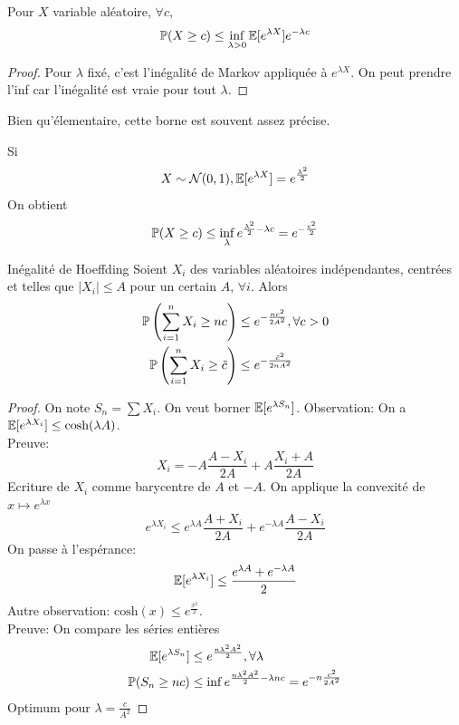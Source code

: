 \documentclass[]{report}
\begin{document}
    \begin{prop}{}{}
        Pour $X$ variable aléatoire, $\forall c,$
        \[\mathbb{P}(X\ge c)\le \inf_{\lambda >0}\mathbb{E}[e^{\lambda X}]e^{-\lambda c}\]
    \end{prop}

    \begin{proof}
        Pour $\lambda$ fixé, c'est l'inégalité de Markov appliquée à $e^{\lambda X}$. On peut prendre l'inf car l'inégalité est vraie pour tout $\lambda$.
    \end{proof}

    \begin{re}{}{}
        Bien qu'élementaire, cette borne est souvent assez précise.
    \end{re}

    \begin{ex}{}{}
        Si
        \[X\sim \mathcal{N}(0,1),\mathbb{E}[ e^{\lambda X}]=e^{\frac{\lambda^2}{2}}\]
        On obtient
        \[\mathbb{P}(X\ge c)\le \inf_\lambda e^{\frac{\lambda^2}{2}-\lambda c}=e^{-\frac{c^2}{2}}\]
    \end{ex}

    \begin{tm}{Inégalité de Hoeffding}{}
        Soient $X_i$ des variables aléatoires indépendantes, centrées et telles que $|X_i|\le A$ pour un certain $A$, $\forall i$. Alors
        \begin{align*}
            \mathbb{P}\left(\sum_{i=1}^{n}X_i\ge nc\right)&\le e^{-\frac{nc^2}{2A^2}},\forall c>0\\
            \mathbb{P}\left(\sum_{i=1}^{n}X_i\ge \tilde{c}\right)&\le e^{-\frac{\tilde{c}^2}{2 nA^2}}
        \end{align*}
    \end{tm}

    \begin{proof}
        On note $S_n=\sum X_i$. On veut borner $\mathbb{E}[e^{\lambda S_n}]$. Observation: On a $\mathbb{E}[e^{\lambda X_i}]\le \text{cosh}(\lambda A)$.\\
        Preuve: \[X_i = -A\frac{A-X_i}{2A}+ A\frac{X_i+A}{2A}\]
        Ecriture de $X_i$ comme barycentre de $A$ et $-A$. On applique la convexité de $x\mapsto e^{\lambda x}$
        \[e^{\lambda X_i}\le e^{\lambda A}\frac{A+X_i}{2A}+e^{-\lambda A}\frac{A-X_i}{2A}\]
        On passe à l'espérance:
        \[\mathbb{E}[e^{\lambda X_i}]\le \frac{e^{\lambda A}+e^{-\lambda A}}{2}\]
        Autre observation: $\text{cosh}(x)\le e^{\frac{x^2}{2}}$.\\
        Preuve: On compare les séries entières
        \begin{align*}
            \mathbb{E}[e^{\lambda S_n}]&\le e^{\frac{n\lambda^2 A^2}{2}},\forall \lambda\\
            \mathbb{P}(S_n\ge nc)&\le \inf e^{\frac{n\lambda^2 A^2}{2}-\lambda nc}=e^{-n\frac{c^2}{2A^2}}
        \end{align*}
        Optimum pour $\lambda=\frac{c}{A^2}$
    \end{proof}
\end{document}
